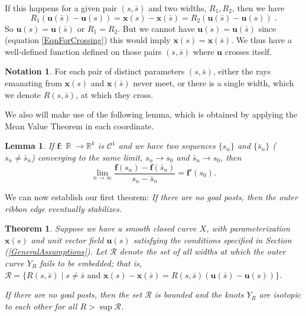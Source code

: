 \documentclass[12pt]{article}
\numberwithin{equation}{subsection}
\newtheorem{thm}{Theorem}
\newtheorem{lem}{Lemma}[thm]
\theoremstyle{definition}
\newtheorem*{no}{Notation}
\numberwithin{lem}{section}
\DeclareMathOperator{\R}{\mathbb{R}}
\def\vecu{\mathbf{u}}
\def\vecx{\mathbf{x}}
\def\vecf{\mathbf{f}}
\begin{document}
If this happens for a given pair $(s, \bar{s})$ and two widths, $R_1, R_2$, then we have
$$ R_1(\mathbf{u}(\bar{s}) - \mathbf{u}(s)) = \mathbf{x}(s) - \mathbf{x}(\bar{s}) = R_2(\mathbf{u}(\bar{s}) - \mathbf{u}(s))\;.$$
So $\vecu(s)=\vecu(\bar{s})$ or $R_1=R_2$. But we cannot have $\vecu(s)=\vecu(\bar{s})$ since (equation \ref{EqnForCrossing}) this would imply $\vecx(s)=\vecx(\bar{s})$. We thus have a well-defined function defined on those pairs $(s, \bar{s})$ where $\vecu$ crosses itself.

\begin{no}
For each pair of distinct parameters $(s, \bar{s})$, either the rays emanating from $\vecx(s)$ and $\vecx(\bar{s})$ never meet, or there is a single width, which we denote $R(s,\bar{s})$, at which they cross. 
\end{no}

We also will make use of the following lemma, which is obtained by applying the Mean Value Theorem in each coordinate.

\begin{lem}
\label{lem:seqderiv}
If $\vecf:\R \rightarrow \mathbb{R}^k$ is $\mathcal{C}^1$ and we have two sequences $\{s_n\}$ and $\{\bar{s}_n\}$  \em{($s_n \neq \bar{s}_n$)} converging to the same limit,  $s_n \rightarrow s_0$ and $\bar{s}_n \rightarrow s_0$, then
$$\lim_{n \rightarrow \infty} \frac{\vecf(s_n) - \vecf(\bar{s}_n)}{s_n - \bar{s}_n} = \vecf'(s_0).$$
\end{lem}

We can now establish our first theorem: {\em If there are no goal posts, then the outer ribbon edge eventually stabilizes.}

\begin{thm}
\label{thm:nogoalposts}
Suppose we have a smooth closed curve $X$, with parameterization $\vecx(s)$ and unit vector field $\vecu(s)$ satisfying the conditions specified in Section (\ref{GeneralAssumptions}). 
Let $\mathcal{R}$ denote  the set of all widths at which the outer curve $Y_R$ fails to be embedded; 
that is, $\mathcal{R} = \{R(s,\bar{s}) \; |\; s \neq \bar{s} \mbox{ and } 
\mathbf{x}(s) - \mathbf{x}(\bar{s}) =
 R(s,\bar{s})(\mathbf{u}(\bar{s}) - \mathbf{u}(s))\}$. 
 
 If there are no goal posts, then the set $\mathcal{R}$ is bounded and the knots $Y_R$ are isotopic to each other for all $R>\mathop{sup} \mathcal{R}$.
\end{thm}
\end{document}
